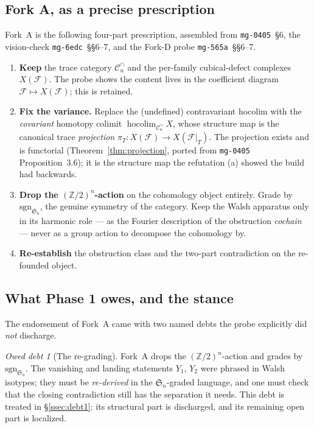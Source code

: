 \documentclass[11pt,oneside]{amsart}
\theoremstyle{plain}
\theoremstyle{definition}
\theoremstyle{remark}
\theoremstyle{honeststyle}
\newtheorem{debt}[theorem]{Owed debt}
\newcommand{\F}{\mathcal{F}}
\newcommand{\sgn}{\mathrm{sgn}}
\newcommand{\Sym}{\mathfrak{S}}
\newcommand{\Z}{\mathbb{Z}}
\newcommand{\Cn}{\mathcal{C}^{\cap}_n}
\newcommand{\hocolim}{\operatorname*{hocolim}}
\begin{document}
\subsection{Fork A, as a precise prescription}
\label{ssec:fork-a-prescription}

Fork~A is the following four-part prescription, assembled from
\texttt{mg-0405}~\S6, the vision-check \texttt{mg-6edc}~\S\S6--7, and
the Fork-D probe \texttt{mg-565a}~\S\S6--7.

\begin{enumerate}[label=\textup{(A\arabic*)},leftmargin=2.8em]
\item \textbf{Keep} the trace category $\Cn$ and the per-family
  cubical-defect complexes $X(\F)$. The probe shows the content lives
  in the coefficient diagram $\F\mapsto X(\F)$; this is retained.
\item \textbf{Fix the variance.} Replace the (undefined) contravariant
  hocolim with the \emph{covariant} homotopy colimit
  $\hocolim_{\Cn}X$, whose structure map is the canonical trace
  \emph{projection} $\pi_T\colon X(\F)\to X(\F|_T)$. The projection
  exists and is functorial (Theorem~\ref{thm:projection}, ported from
  \texttt{mg-0405} Proposition~3.6); it is the structure map the
  refutation (a) showed the build had backwards.
\item \textbf{Drop the $(\Z/2)^n$-action} on the cohomology object
  entirely. Grade by $\sgn_{\Sym_n}$, the genuine symmetry of the
  category. Keep the Walsh apparatus only in its harmonic role --- as
  the Fourier description of the obstruction \emph{cochain} --- never
  as a group action to decompose the cohomology by.
\item \textbf{Re-establish} the obstruction class and the two-part
  contradiction on the re-founded object.
\end{enumerate}

\subsection{What Phase 1 owes, and the stance}
\label{ssec:owed}

The endorsement of Fork~A came with two named debts the probe
explicitly did \emph{not} discharge.

\begin{debt}[The re-grading]
\label{debt:regrading}
Fork~A drops the $(\Z/2)^n$-action and grades by $\sgn_{\Sym_n}$. The
vanishing and landing statements $Y_1$, $Y_2$ were phrased in Walsh
isotypes; they must be \emph{re-derived} in the $\Sym_n$-graded
language, and one must check that the closing contradiction still has
the separation it needs. This debt is treated in \S\ref{ssec:debt1}:
its structural part is discharged, and its remaining open part is
localized.
\end{debt}
\end{document}
